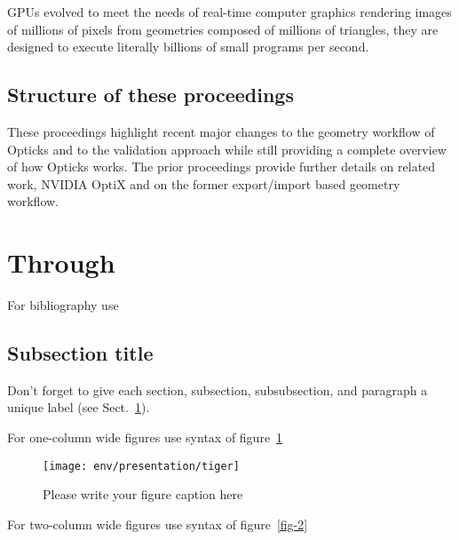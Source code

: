\documentclass{webofc}
\begin{document}
GPUs evolved to meet the needs of real-time computer graphics rendering images of millions of pixels from geometries
composed of millions of triangles, they are designed to execute literally billions of small programs per second.





    


\subsection{Structure of these proceedings}  

These proceedings highlight recent major changes to the geometry workflow of Opticks 
and to the validation approach while still providing a complete overview of how Opticks works. 
The prior proceedings\cite{chep2016} provide further details on related work, NVIDIA OptiX
and on the former export/import based geometry workflow.





\section{Through}
\label{sec-1}
For bibliography use \cite{RefJ}
\subsection{Subsection title}
\label{sec-2}
Don't forget to give each section, subsection, subsubsection, and
paragraph a unique label (see Sect.~\ref{sec-1}).

For one-column wide figures use syntax of figure~\ref{fig-1}
\begin{figure}[h]
\centering
\texttt{[image: env/presentation/tiger]}
\caption{Please write your figure caption here}
\label{fig-1}       %
\end{figure}

For two-column wide figures use syntax of figure~\ref{fig-2}
\begin{figure*}
\centering
\vspace*{5cm}       %
\caption{Please write your figure caption here}
\label{fig-2}       %
\end{figure*}
\end{document}
